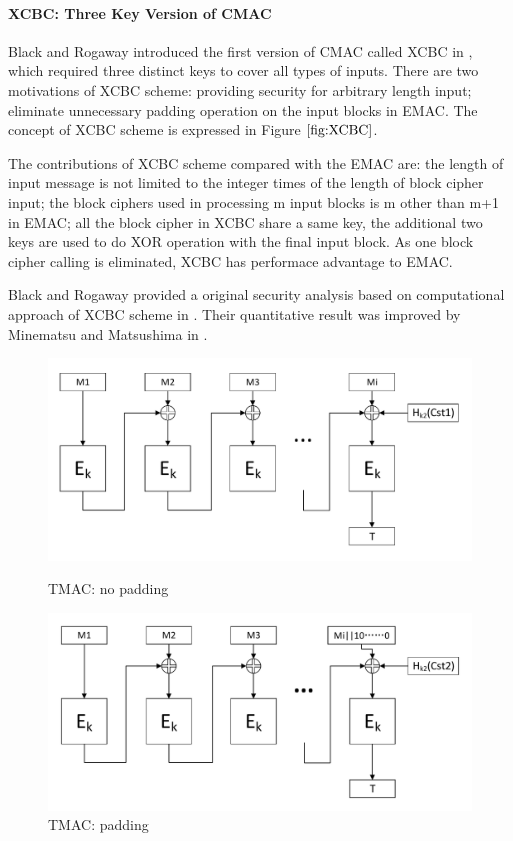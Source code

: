 \documentclass{article}
\begin{document}
\paragraph{XCBC: Three Key Version of CMAC}
Black and Rogaway introduced the first version of CMAC called XCBC in \cite{xcbc}, which required three distinct keys to cover all types of inputs.
There are two motivations of XCBC scheme: providing security for arbitrary length input; eliminate unnecessary padding operation on the input blocks in EMAC. The concept of XCBC scheme is expressed in Figure $\ref{fig:XCBC}$.

The contributions of XCBC scheme compared with the EMAC are: the length of input message is not limited to the integer times of the length of block cipher input; the block ciphers used in processing m input blocks is m other than m+1 in EMAC; all the block cipher in XCBC share a same key, the additional two keys are used to do XOR operation with the final input block. As one block cipher calling is eliminated, XCBC has performace advantage to EMAC.   

Black and Rogaway provided a original security analysis based on computational approach of XCBC scheme in \cite{xcbc}. Their quantitative result was improved by Minematsu and Matsushima in \cite{new}. 

\begin{figure}[htbp]
\centering
\includegraphics[scale=0.5]{./diagrams/tmac_nopadding.pdf}
\caption{TMAC: no padding}
\includegraphics[scale=0.5]{./diagrams/tmac_padding.pdf}
\caption{TMAC: padding}
\label{fig:TMAC}
\end{figure}
\end{document}
